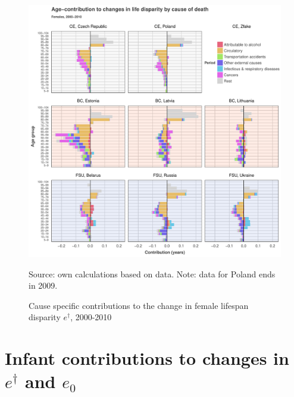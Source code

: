 \documentclass{article}
\begin{document}
\begin{figure}[h!]
\caption{Cause specific contributions to the change in  female lifespan disparity  $e^\dagger$, 2000-2010}
\centering
\begin{center}
\includegraphics[scale=.5]{Figures/Cause_ed_decomp_Females_2.pdf}
\end{center}
Source: own calculations based on \citet{HMD} data. Note: data for Poland ends in 2009.
\end{figure}

\newpage



\section*{Infant contributions to changes in $e^\dagger$ and $e_0$}
\end{document}
